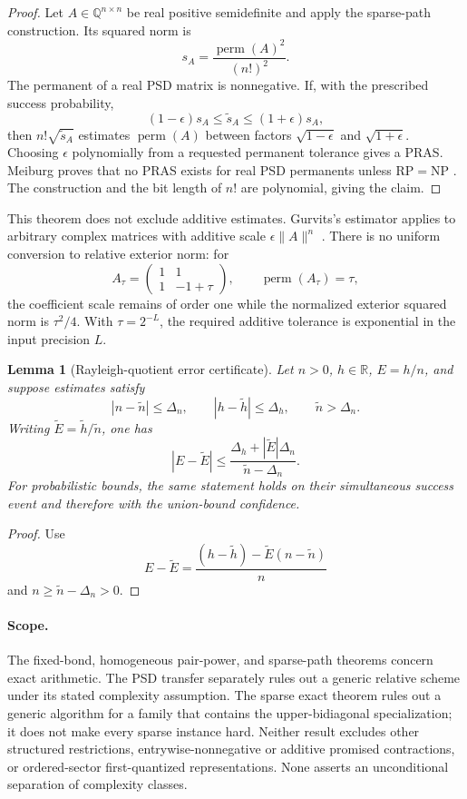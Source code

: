 \documentclass[11pt]{article}
\newtheorem{lemma}[theorem]{Lemma}
\begin{document}
\begin{proof}
Let $A\in\mathbb Q^{n\times n}$ be real positive semidefinite and apply the
sparse-path construction. Its squared norm is
\[
 s_A=\frac{\operatorname{perm}(A)^2}{(n!)^2}.
\]
The permanent of a real PSD matrix is nonnegative. If, with the prescribed
success probability,
\[
 (1-\epsilon)s_A\le \widetilde s_A\le(1+\epsilon)s_A,
\]
then $n!\sqrt{\widetilde s_A}$ estimates $\operatorname{perm}(A)$ between
factors $\sqrt{1-\epsilon}$ and $\sqrt{1+\epsilon}$. Choosing $\epsilon$
polynomially from a requested permanent tolerance gives a PRAS. Meiburg proves
that no PRAS exists for real PSD permanents unless
$\mathrm{RP}=\mathrm{NP}$ \cite{Meiburg2023}. The construction and the bit
length of $n!$ are polynomial, giving the claim.
\end{proof}

This theorem does not exclude additive estimates. Gurvits's estimator applies
to arbitrary complex matrices with additive scale
$\epsilon\lVert A\rVert^n$ \cite{AaronsonHance2014}. There is no uniform
conversion to relative exterior norm: for
\[
 A_\tau=\begin{pmatrix}1&1\\1&-1+\tau\end{pmatrix},
 \qquad \operatorname{perm}(A_\tau)=\tau,
\]
the coefficient scale remains of order one while the normalized exterior
squared norm is $\tau^2/4$. With $\tau=2^{-L}$, the required additive
tolerance is exponential in the input precision $L$.

\begin{lemma}[Rayleigh-quotient error certificate]
Let $n>0$, $h\in\mathbb R$, $E=h/n$, and suppose estimates satisfy
\[
 |n-\widetilde n|\le\Delta_n,\qquad
 |h-\widetilde h|\le\Delta_h,\qquad
 \widetilde n>\Delta_n.
\]
Writing $\widetilde E=\widetilde h/\widetilde n$, one has
\[
 |E-\widetilde E|
 \le
 \frac{\Delta_h+|\widetilde E|\Delta_n}
      {\widetilde n-\Delta_n}.
\]
For probabilistic bounds, the same statement holds on their simultaneous
success event and therefore with the union-bound confidence.
\end{lemma}

\begin{proof}
Use
\[
 E-\widetilde E
 =\frac{(h-\widetilde h)-\widetilde E(n-\widetilde n)}{n}
\]
and $n\ge\widetilde n-\Delta_n>0$.
\end{proof}

\paragraph{Scope.}
The fixed-bond, homogeneous pair-power, and sparse-path theorems concern exact
arithmetic. The PSD transfer separately rules out a generic relative scheme
under its stated complexity assumption. The sparse exact theorem rules out a generic
algorithm for a family that contains the upper-bidiagonal specialization; it
does not make every sparse instance hard. Neither result excludes other
structured restrictions, entrywise-nonnegative or additive promised
contractions, or ordered-sector first-quantized representations. None asserts
an unconditional separation of complexity classes.
\end{document}
